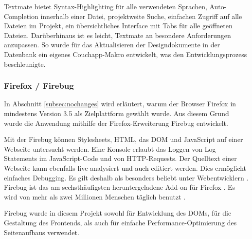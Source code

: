 Textmate bietet Syntax-Highlighting für alle verwendeten Sprachen, Auto-Completion innerhalb einer Datei, projektweite Suche, einfachen Zugriff auf alle Dateien im Projekt, ein übersichtliches Interface mit Tabs für alle geöffneten Dateien. Darüberhinaus ist es leicht, Textmate an besondere Anforderungen anzupassen. So wurde für das Aktualisieren der Designdokumente in der Datenbank ein eigenes Couchapp-Makro entwickelt, was den Entwicklungsprozess beschleunigte.  


\subsubsection{Firefox / Firebug}


In Abschnitt \ref{subsec:nochanges} wird erläutert, warum der Browser Firefox \cite{firefox} in mindestens Version 3.5 als Zielplattform gewählt wurde. Aus diesem Grund wurde die Anwendung mithilfe der Firefox-Erweiterung Firebug \cite{firebug} entwickelt. 

Mit der Firebug können Stylesheets, HTML, das DOM und JavaScript auf einer Webseite untersucht werden. Eine Konsole erlaubt das Loggen von Log-Statements im JavaScript-Code und von HTTP-Requests. Der Quelltext einer Webseite kann ebenfalls live analysiert und auch editiert werden. Dies ermöglicht einfaches Debugging. Es gilt deshalb als besonders beliebt unter Webentwicklern \cite{firebug:beliebt}. Firebug ist das am sechsthäufigsten heruntergeladene Add-on für Firefox \cite{firebug:haeufig}. Es wird von mehr als zwei Millionen Menschen täglich benutzt \cite{firebug:stats}. 

Firebug wurde in diesem Projekt sowohl für Entwicklung des DOMs, für die Gestaltung des Frontends, als auch für einfache Performance-Optimierung des Seitenaufbaus verwendet. 
